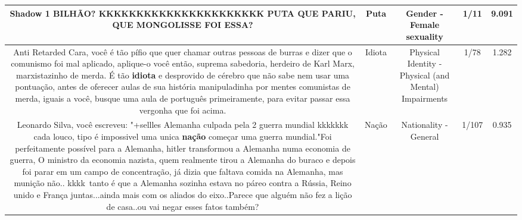 \documentclass[11pt]{article}
\newlength\mylength
\begin{document}
\begin{center}
\begin{longtable}{|C{.65\mylength}|C{.30\mylength}|C{.12\mylength}|C{.12\mylength}|C{.12\mylength}|}
  \small Shadow 1 BILHÃO? KKKKKKKKKKKKKKKKKKKKKK \textbf{PUTA} QUE PARIU, QUE MONGOLISSE FOI ESSA?\normalsize   & Puta & Gender - Female sexuality & 1/11 & 9.091 \\  \hline
  \small Anti Retarded Cara, você é tão pífio que quer chamar outras pessoas de burras e dizer que o comunismo foi mal aplicado, aplique-o você então, suprema sabedoria, herdeiro de Karl Marx, marxistazinho de merda. É tão \textbf{idiota} e desprovido de cérebro que não sabe nem usar uma pontuação, antes de oferecer aulas de sua história manipuladinha por mentes comunistas de merda, iguais a você, busque uma aula de português primeiramente, para evitar passar essa vergonha que foi acima.\normalsize   & Idiota & Physical Identity - Physical (and Mental) Impairments & 1/78 & 1.282 \\  \hline
  \small Leonardo Silva, você escreveu: "+sellles Alemanha culpada pela 2 guerra mundial kkkkkkk cada louco, tipo é impossivel uma unica \textbf{nação} começar uma guerra mundial."Foi perfeitamente possível para a Alemanha, hitler transformou a Alemanha numa economia de guerra, O ministro da economia nazista, quem realmente tirou a Alemanha do buraco e depois foi parar em um campo de concentração, já dizia que faltava comida na Alemanha, mas munição não.. kkkk tanto é que a Alemanha sozinha estava no páreo contra a Rússia, Reino unido e França juntas...ainda mais com os aliados do eixo..Parece que alguém não fez a lição de casa..ou vai negar esses fatos também?\normalsize   & Nação & Nationality - General & 1/107 & 0.935 \\  \hline

\end{longtable}
\end{center}
\end{document}
